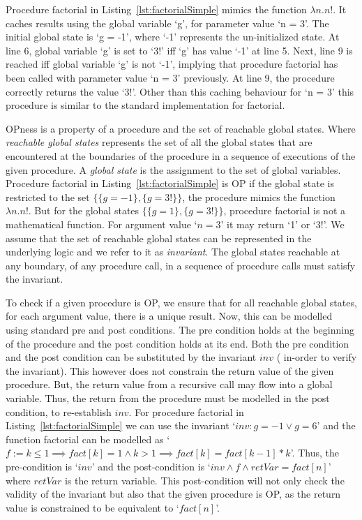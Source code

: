 \documentclass{llncs}
\newcommand{\inv}{\mathit{inv}}
\newcommand{\retVar}{\textit{retVar}}
\newcommand{\fact}{\mathit{fact}}
\begin{document}
Procedure factorial in Listing~\ref{lst:factorialSimple} mimics the
function $\lambda n. n!$. It caches results using the global variable
`g', for parameter value `n = 3'. The initial global state is `g =
-1', where `-1' represents the un-initialized state. At line 6, global
variable `g' is set to `3!' iff `g' has value `-1' at line 5. Next,
line 9 is reached iff global variable `g' is not `-1', implying that
procedure factorial has been called with parameter value `n = 3'
previously. At line 9, the procedure correctly returns the value
`3!'. Other than this caching behaviour for `n = 3' this procedure is
similar to the standard implementation for factorial.

OPness is a property of a procedure and the set of reachable global
states. Where \textit{reachable global states} represents the set of
all the global states that are encountered at the boundaries of the
procedure in a sequence of executions of the given procedure. A
\textit{global state} is the assignment to the set of global
variables. Procedure factorial in Listing~\ref{lst:factorialSimple}
is OP if the global state is restricted to the set $\{\{g = -1\}, \{g
= 3!\}\}$, the procedure mimics the function $\lambda n.n!$. But for
the global states $\{\{g = 1\}, \{g = 3!\}\}$, procedure factorial
is not a mathematical function. For argument value `$n = 3$' it may
return `1' or `3!'.  We assume that the set of reachable global states
can be represented in the underlying logic and we refer to it as
\textit{invariant}.  The global states reachable at any boundary, of
any procedure call, in a sequence of procedure calls must satisfy the
invariant.

To check if a given procedure is OP, we ensure that for all reachable
global states, for each argument value, there is a unique result. Now,
this can be modelled using standard pre and post conditions. The pre
condition holds at the beginning of the procedure and the post
condition holds at its end. Both the pre condition and the post
condition can be substituted by the invariant $\inv$ ( in-order to
verify the invariant). This however does not constrain the return
value of the given procedure. But, the return value from a recursive
call may flow into a global variable. Thus, the return from the
procedure must be modelled in the post condition, to
re-establish $\inv$.  For procedure factorial in
Listing~\ref{lst:factorialSimple} we can use the invariant `$\inv : g
= -1 \vee g = 6$' and the function factorial can be modelled as `$ f
:= k \leq 1 \implies \fact[k] = 1 \wedge k >1 \implies \fact[k] =
\fact[k-1]*k$'. Thus, the pre-condition is `$\inv$' and the
post-condition is `$\inv \wedge f \wedge \retVar = fact[n]$' where
$\retVar$ is the return variable. This post-condition will not only
check the validity of the invariant but also that the given procedure
is OP, as the return value is constrained to be equivalent to
`$fact[n]$'.
\end{document}
